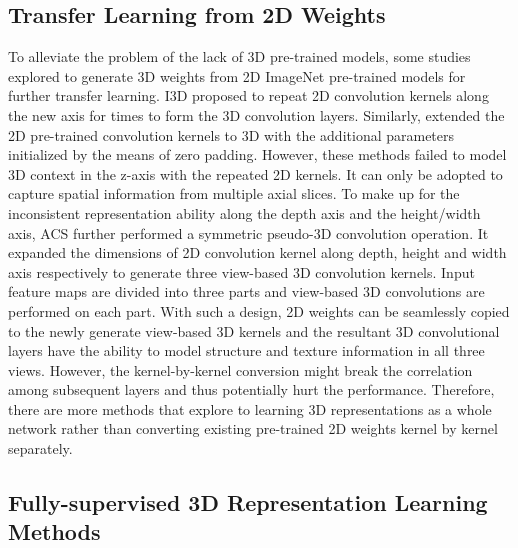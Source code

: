 \documentclass[journal,twoside,web]{ieeecolor}
\begin{document}
\subsection{Transfer Learning from 2D Weights}

To alleviate the problem of the lack of 3D pre-trained models, some studies explored to generate 3D weights from 2D ImageNet pre-trained models for further transfer learning. I3D\cite{carreira2017quo} proposed to repeat 2D convolution kernels along the new axis for  times to form the  3D convolution layers. Similarly, \cite{shan20183} extended the 2D pre-trained convolution kernels to 3D with the additional parameters initialized by the means of zero padding.
However, these methods failed to model 3D context in the z-axis with the repeated 2D kernels. It can only be adopted to capture spatial information from multiple axial slices.
To make up for the inconsistent representation ability along the depth axis and the height/width axis, ACS\cite{yang2019reinventing} further performed a symmetric pseudo-3D convolution operation. It expanded the dimensions of 2D convolution kernel along depth, height and width axis respectively to generate three view-based 3D convolution kernels. Input feature maps are divided into three parts and view-based 3D convolutions are performed on each part. 
With such a design, 2D weights can be seamlessly copied to the newly generate view-based 3D kernels and the resultant 3D convolutional layers have the ability to model structure and texture information in all three views. However, the kernel-by-kernel conversion might break the correlation among subsequent layers and thus potentially hurt the performance. Therefore, there are more methods that explore to learning 3D representations as a whole network rather than converting existing pre-trained 2D weights kernel by kernel separately. 






\subsection{Fully-supervised 3D Representation Learning Methods}
\end{document}
